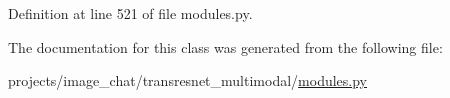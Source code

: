 Definition at line 521 of file modules.\+py.



The documentation for this class was generated from the following file\+:\begin{DoxyCompactItemize}
\item 
projects/image\+\_\+chat/transresnet\+\_\+multimodal/\hyperlink{projects_2image__chat_2transresnet__multimodal_2modules_8py}{modules.\+py}\end{DoxyCompactItemize}
